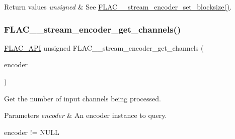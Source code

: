 \begin{DoxyRetVals}{Return values}
{\em unsigned} & See \hyperlink{group__flac__stream__encoder_gae6c001cd7601192334c58ee3631b571f}{F\+L\+A\+C\+\_\+\+\_\+stream\+\_\+encoder\+\_\+set\+\_\+blocksize()}. \\
\hline
\end{DoxyRetVals}
\mbox{\label{group__flac__stream__encoder_ga4e94f87c0dc9bfc95d57217349aa5c82}} 
\subsubsection{\texorpdfstring{F\+L\+A\+C\+\_\+\+\_\+stream\+\_\+encoder\+\_\+get\+\_\+channels()}{FLAC\_\_stream\_encoder\_get\_channels()}}
{\footnotesize\ttfamily \hyperlink{group__flac__export_ga56ca07df8a23310707732b1c0007d6f5}{F\+L\+A\+C\+\_\+\+A\+PI} unsigned F\+L\+A\+C\+\_\+\+\_\+stream\+\_\+encoder\+\_\+get\+\_\+channels (\begin{DoxyParamCaption}\item[{\hyperlink{zconf_8h_a2c212835823e3c54a8ab6d95c652660e}{const} \hyperlink{struct_f_l_a_c_____stream_encoder}{F\+L\+A\+C\+\_\+\+\_\+\+Stream\+Encoder} $\ast$}]{encoder }\end{DoxyParamCaption})}

Get the number of input channels being processed.


\begin{DoxyParams}{Parameters}
{\em encoder} & An encoder instance to query.  
\begin{DoxyCode}
encoder != NULL 
\end{DoxyCode}
 \\
\hline
\end{DoxyParams}

